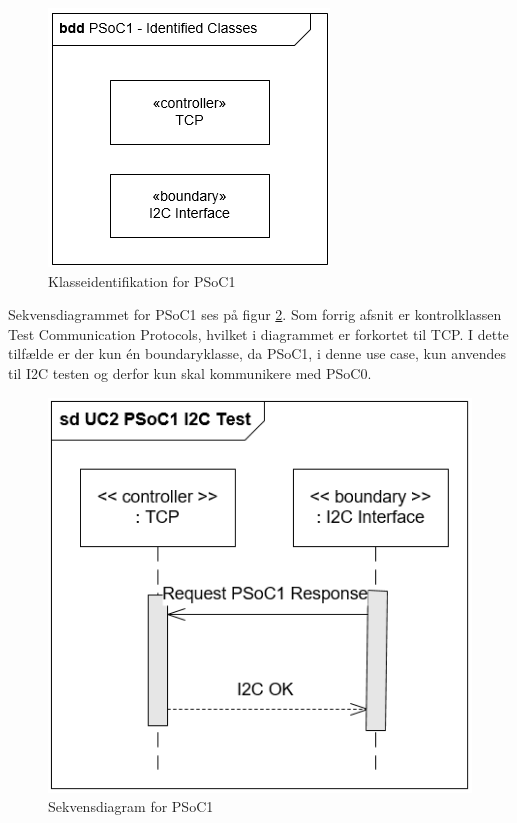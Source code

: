 \begin{figure}[H]
	\centering
	\includegraphics[scale=0.8]{Systemarkitektur/images/KlasseIdentifikationPSoC1.png}
	\caption{Klasseidentifikation for PSoC1}
	\label{fig:klasseidentifikationPSoC1}
\end{figure}

Sekvensdiagrammet for PSoC1 ses på figur \ref{fig:sekvensPSoC1I2CTest}. Som forrig afsnit er kontrolklassen Test Communication Protocols, hvilket i diagrammet er forkortet til TCP. I dette tilfælde er der kun én boundaryklasse, da PSoC1, i denne use case, kun anvendes til I2C testen og derfor kun skal kommunikere med PSoC0. 

\begin{figure}[H]
	\centering
	\includegraphics[width=.8\textwidth] {Systemarkitektur/images/SDPSoC1I2CTest}
	\caption{Sekvensdiagram for PSoC1}
	\label{fig:sekvensPSoC1I2CTest}
\end{figure}

